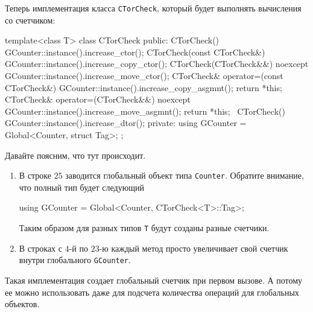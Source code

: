 Теперь имплементация класса \verb"CTorCheck", который будет выполнять вычисления со счетчиком:
\begin{cppcode}
template<class T>
class CTorCheck {
public:
  CTorCheck() {
    GCounter::instance().increase_ctor();
  }
  CTorCheck(const CTorCheck&) {
      GCounter::instance().increase_copy_ctor();
  }
  CTorCheck(CTorCheck&&) noexcept {
      GCounter::instance().increase_move_ctor();
  }
  CTorCheck& operator=(const CTorCheck&) {
    GCounter::instance().increase_copy_asgmnt();
    return *this;
  }
  CTorCheck& operator=(CTorCheck&&) noexcept {
    GCounter::instance().increase_move_asgmnt();
    return *this;
  }
  ~CTorCheck() {
    GCounter::instance().increase_dtor();
  }
private:
  using GCounter = Global<Counter, struct Tag>;
};
\end{cppcode}
Давайте поясним, что тут происходит.
\begin{enumerate}
\item В строке $25$ заводится глобальный объект типа \verb"Counter".
Обратите внимание, что полный тип будет следующий
\begin{cppcode}[numbers = none]
using GCounter = Global<Counter, CTorCheck<T>::Tag>;
\end{cppcode}
Таким образом для разных типов \verb"T" будут созданы разные счетчики.

\item В строках с $4$-й по $23$-ю каждый метод просто увеличивает свой счетчик внутри глобального \verb"GCounter".
\end{enumerate}
Такая имплементация создает глобальный счетчик при первом вызове.
А потому ее можно использовать даже для подсчета количества операций для глобальных объектов.
